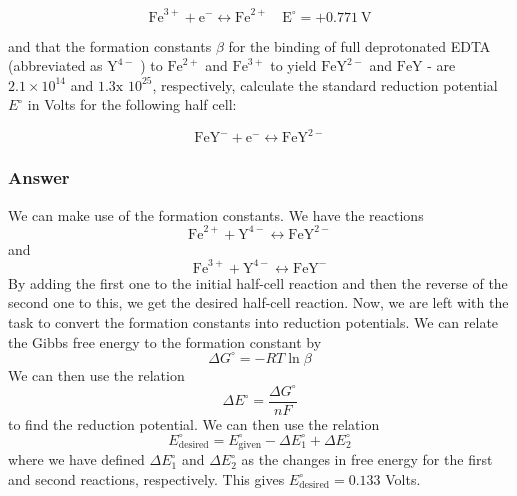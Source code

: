 \documentclass[12pt]{article}
\begin{document}
$$
\mathrm{Fe}^{3+}+\mathrm{e}^{-} \leftrightarrow \mathrm{Fe}^{2+} \quad \mathrm{E}^{\circ}=+0.771 \mathrm{~V}
$$

and that the formation constants $\beta$ for the binding of full deprotonated EDTA (abbreviated as $\mathrm{Y}^{4-}$ ) to $\mathrm{Fe}^{2+}$ and $\mathrm{Fe}^{3+}$ to yield $\mathrm{FeY}^{2-}$ and $\mathrm{FeY}$ - are $2.1 \times 10^{14}$ and $1.3 \mathrm{x}$ $10^{25}$, respectively, calculate the standard reduction potential $E^{\circ}$ in Volts for the following half cell:

$$
\mathrm{FeY}^{-}+\mathrm{e}^{-} \leftrightarrow \mathrm{FeY}^{2-}
$$
\subsubsection{Answer}
We can make use of the formation constants. We have the reactions
\begin{equation}
  \mathrm{Fe}^{2+}+\mathrm{Y}^{4-} \leftrightarrow \mathrm{FeY}^{2-}
\end{equation}
and
\begin{equation}
  \mathrm{Fe}^{3+}+\mathrm{Y}^{4-} \leftrightarrow \mathrm{FeY}^{-}
\end{equation}
By adding the first one to the initial half-cell reaction and then the reverse of the second one to this, we get the desired half-cell reaction. Now, we are left with the task to convert the formation constants into reduction potentials. We can relate the Gibbs free energy to the formation constant by
\begin{equation}
  \Delta G^{\circ} = -RT \ln \beta 
\end{equation}
We can then use the relation
\begin{equation}
  \Delta E^{\circ} = \frac{\Delta G^{\circ}}{nF}
\end{equation}
to find the reduction potential. We can then use the relation
\begin{equation}
  E^{\circ}_{\mathrm{desired}} = E^{\circ}_{\mathrm{given}} - \Delta E^{\circ}_1 + \Delta E^{\circ}_2
\end{equation}
where we have defined $\Delta E^{\circ}_1$ and $\Delta E^{\circ}_2$ as the changes in free energy for the first and second reactions, respectively.
This gives $E^{\circ}_{\mathrm{desired}} = 0.133$ Volts.
\end{document}
